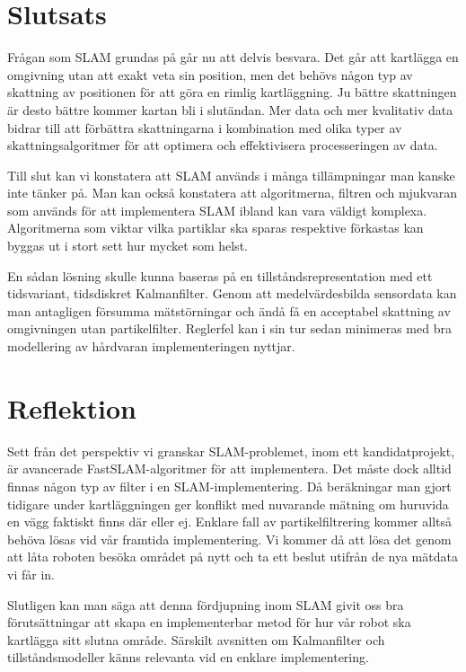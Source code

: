 \documentclass[a4paper,12pt,fleqn]{article}
\begin{document}
\newpage
\section{Slutsats}

Frågan som SLAM grundas på går nu att delvis besvara. Det går att kartlägga en omgivning utan att exakt veta sin position, men det behövs någon typ av skattning av positionen för att göra en rimlig kartläggning. Ju bättre skattningen är desto bättre kommer kartan bli i slutändan. Mer data och mer kvalitativ data bidrar till att förbättra skattningarna i kombination med olika typer av skattningsalgoritmer för att optimera och effektivisera processeringen av data.

Till slut kan vi konstatera att SLAM används i många tillämpningar man kanske inte tänker på. Man kan också konstatera att algoritmerna, filtren och mjukvaran som används för att implementera SLAM ibland kan vara väldigt komplexa. Algoritmerna som viktar vilka partiklar ska sparas respektive förkastas kan byggas ut i stort sett hur mycket som helst. 

En sådan lösning skulle kunna baseras på en tillståndsrepresentation med ett tidsvariant, tidsdiskret Kalmanfilter. Genom att medelvärdesbilda sensordata kan man antagligen försumma mätstörningar och ändå få en acceptabel skattning av omgivningen utan partikelfilter. Reglerfel kan i sin tur sedan minimeras med bra modellering av hårdvaran implementeringen nyttjar. 

\section{Reflektion}

Sett från det perspektiv vi granskar SLAM-problemet, inom ett kandidatprojekt, är avancerade FastSLAM-algoritmer för att implementera. Det måste dock alltid finnas någon typ av filter i en SLAM-implementering. Då beräkningar man gjort tidigare under kartläggningen ger konflikt med nuvarande mätning om huruvida en vägg faktiskt finns där eller ej. Enklare fall av partikelfiltrering kommer alltså behöva lösas vid vår framtida implementering. Vi kommer då att lösa det genom att låta roboten besöka området på nytt och ta ett beslut utifrån de nya mätdata vi får in. 

Slutligen kan man säga att denna fördjupning inom SLAM givit oss bra förutsättningar att skapa en implementerbar metod för hur vår robot ska kartlägga sitt slutna område. Särskilt avsnitten om Kalmanfilter och tillståndsmodeller känns relevanta vid en enklare implementering. 
\end{document}
